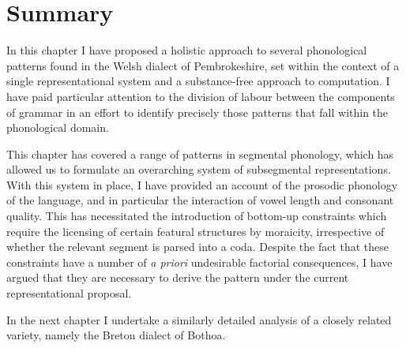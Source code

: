 \section{Summary}
\label{sec:summary-1}

In this chapter I have proposed a holistic approach to several phonological patterns found in the Welsh dialect of Pembrokeshire, set within the context of a single representational system and a substance\hyp free approach to computation. I have paid particular attention to the division of labour between the components of grammar in an effort to identify precisely those patterns that fall within the phonological domain.

This chapter has covered a range of patterns in segmental phonology, which has allowed us to formulate an overarching system of subsegmental representations. With this system in place, I have provided an account of the prosodic phonology of the language, and in particular the interaction of vowel length and consonant quality. This has necessitated the introduction of bottom\hyp up constraints which require the licensing of certain featural structures by moraicity, irrespective of whether the relevant segment is parsed into a coda. Despite the fact that these constraints have a number of \emph{a priori} undesirable factorial consequences, I have argued that they are necessary to derive the pattern under the current representational proposal.

In the next chapter I undertake a similarly detailed analysis of a closely related variety, namely the Breton dialect of Bothoa.